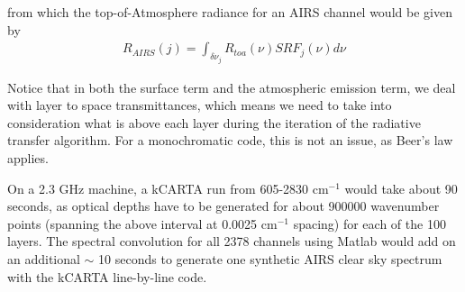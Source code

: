 \documentclass[11pt]{article}
\newcommand{\kc}{\textsf{kCARTA}\xspace}
\newcommand{\wn}{cm$^{-1}$\xspace}
\begin{document}
from which the top-of-Atmosphere radiance for an AIRS channel would be given by
\begin{eqnarray*}
  R_{AIRS}(j) = \int_{\delta \nu_{j}} R_{toa}(\nu) SRF_{j}(\nu) d\nu
\end{eqnarray*}

Notice that in both the surface term and the atmospheric emission term, we deal with layer to 
space transmittances, which means we need to take into consideration what is above each layer during 
the iteration of the radiative transfer algorithm. For a monochromatic code, this is not an issue, as 
Beer's law applies.

On a 2.3 GHz machine, a \kc run from 605-2830 \wn would take about 90 seconds, as optical depths have to be 
generated for about 900000 wavenumber points (spanning the above interval at 0.0025 \wn spacing) for each 
of the 100 layers. The spectral convolution for all 2378 channels using Matlab would add on an additional 
$\sim$ 10 seconds to generate one synthetic AIRS clear sky spectrum with the \kc line-by-line code.
\end{document}
